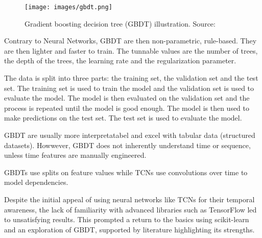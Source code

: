 \begin{figure}[h!]
\centering
\texttt{[image: images/gbdt.png]}
\caption{Gradient boosting decision tree (GBDT) illustration. Source: \cite{SaniAbba2022}}
\label{fig:gbdt-illustration}
\end{figure}

Contrary to Neural Networks, GBDT are then non-parametric, rule-based. They are then lighter and 
faster to train. The tunnable values are the number of trees, the depth of the trees, the learning 
rate and the regularization parameter.

The data is split into three parts: the training set, the validation set and the test set. The training set is 
used to train the model and the validation set is used to evaluate the model. The model is then 
evaluated on the validation set and the process is repeated until the model is good enough. 
The model is then used to make predictions on the test set. The test set is used to evaluate the model.

GBDT are usually more interpretatabel and excel with tabular data (structured datasets). Howwever, 
GBDT does not inherently understand time or sequence, unless time features are manually engineered.

GBDTs use splits on feature values while TCNs use convolutions over time to model dependencies.




Despite the initial appeal of using neural networks like TCNs for their temporal 
awareness, the lack of familiarity with advanced libraries such as TensorFlow led 
to unsatisfying results. This prompted a return to the basics using scikit-learn and 
an exploration of GBDT, supported by literature highlighting its strengths.

